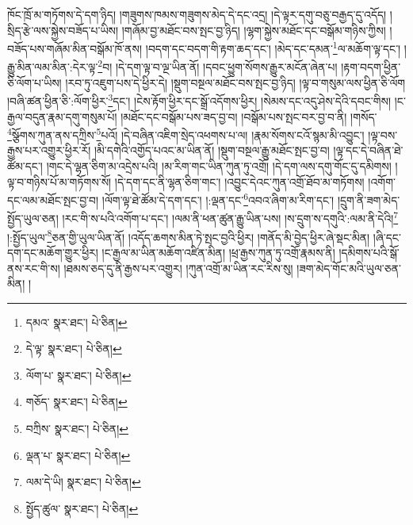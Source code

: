 ཁོང་ཁྲོ་མ་གཏོགས་དེ་དག་ཉིད། །གཟུགས་ཁམས་གཟུགས་མེད་དེ་དང་འདྲ། །དེ་ལྟར་དགུ་བཅུ་བརྒྱད་དུ་འདོད། །སྲིད་རྩེ་ལས་སྐྱེས་བཟོད་པ་ཡིས། །གཞོམ་བྱ་མཐོང་བས་སྤང་བྱ་ཉིད། །ལྷག་སྐྱེས་མཐོང་དང་བསྒོམ་གཉིས་ཀྱིས། །བཟོད་པས་གཞོམ་མིན་བསྒོམ་ཁོ་ནས། །བདག་དང་བདག་གི་རྟག་ཆད་དང་། །མེད་དང་དམན་\footnote{དམའ་  སྣར་ཐང་།  པེ་ཅིན། }ལ་མཆོག་ལྟ་དང་། །རྒྱུ་མིན་ལམ་མིན་:དེར་ལྟ་\footnote{དེ་ལྟ་  སྣར་ཐང་།  པེ་ཅིན། }བ། །དེ་དག་ལྟ་བ་ལྔ་ཡིན་ནོ། །དབང་ཕྱུག་སོགས་རྒྱུར་མངོན་ཞེན་པ། །རྟག་བདག་ཕྱིན་ཅི་ལོག་པ་ཡིས། །རབ་ཏུ་འཇུག་པས་དེ་ཕྱིར་དེ། །སྡུག་བསྔལ་མཐོང་བས་སྤང་བྱ་ཉིད། །ལྟ་བ་གསུམ་ལས་ཕྱིན་ཅི་ལོག །བཞི་ཚན་ཕྱིན་ཅི་:ལོག་ཕྱིར་\footnote{ལོག་པ་  སྣར་ཐང་།  པེ་ཅིན། }དང་། །ངེས་རྟོག་ཕྱིར་དང་སྒྲོ་འདོགས་ཕྱིར། །སེམས་དང་འདུ་ཤེས་དེའི་དབང་གིས། །ང་རྒྱལ་བདུན་རྣམ་དགུ་གསུམ་པོ། །མཐོང་དང་བསྒོམ་པས་ཟད་བྱ་བ། །བསྒོམ་པས་སྤང་བར་བྱ་བ་ནི། །གསོད་\footnote{གཅོད་  སྣར་ཐང་།  པེ་ཅིན། }སྩོགས་ཀུན་ནས་དཀྲིས་\footnote{བཀྲིས་  སྣར་ཐང་།  པེ་ཅིན། }པའོ། །དེ་བཞིན་འཇིག་སྲེད་འཕགས་པ་ལ། །རྣམ་སོགས་ངའོ་སྙམ་མི་འབྱུང་། །ལྟ་བས་རྒྱས་པར་འགྱུར་ཕྱིར་རོ། །མི་དགེའི་འགྱོད་པའང་མ་ཡིན་ནོ། །སྡུག་བསྔལ་རྒྱུ་མཐོང་སྤང་བྱ་བ། །ལྟ་དང་དེ་བཞིན་ཐེ་ཚོམ་དང་། །གང་དེ་ལྷན་ཅིག་མ་འདྲེས་པའི། །མ་རིག་གང་ཡིན་ཀུན་ཏུ་འགྲོ། །དེ་དག་ལས་དགུ་གོང་དུ་དམིགས། །ལྟ་བ་གཉིས་པོ་མ་གཏོགས་སོ། །དེ་དག་དང་ནི་ལྷན་ཅིག་གང་། །འབྱུང་དེའང་ཀུན་འགྲོ་ཐོབ་མ་གཏོགས། །འགོག་དང་ལམ་མཐོང་སྤང་བྱ་བ། །ལོག་ལྟ་ཐེ་ཚོམ་དེ་དག་དང་། །:ལྡན་དང་\footnote{ལྡན་པ་  སྣར་ཐང་།  པེ་ཅིན། }འབའ་ཞིག་མ་རིག་དང་། །དྲུག་ནི་ཟག་མེད་སྤྱོད་ཡུལ་ཅན། །རང་གི་ས་པའི་འགོག་པ་དང་། །ལམ་ནི་ཕན་ཚུན་རྒྱུ་ཡིན་པས། །ས་དྲུག་ས་དགུའི་:ལམ་ནི་དེའི།\footnote{ལམ་དེ་ཡི།  སྣར་ཐང་།  པེ་ཅིན། } །:སྤྱོད་ཡུལ་\footnote{སྤྱོད་ཚུལ་  སྣར་ཐང་།  པེ་ཅིན། }ཅན་གྱི་ཡུལ་ཡིན་ནོ། །འདོད་ཆགས་མིན་ཏེ་སྤང་བྱའི་ཕྱིར། །གནོད་མི་བྱེད་ཕྱིར་ཞེ་སྡང་མིན། །ཞི་དང་དག་དང་མཆོག་གྱུར་ཕྱིར། །ང་རྒྱལ་མ་ཡིན་མཆོག་འཛིན་མིན། །ཕྲ་རྒྱས་ཀུན་ཏུ་འགྲོ་རྣམས་ནི། །དམིགས་པའི་སྒོ་ནས་རང་གི་ས། །ཐམས་ཅད་དུ་ནི་རྒྱས་པར་འགྱུར། །ཀུན་འགྲོ་མ་ཡིན་རང་རིས་སུ། །ཟག་མེད་གོང་མའི་ཡུལ་ཅན་མིན། །
